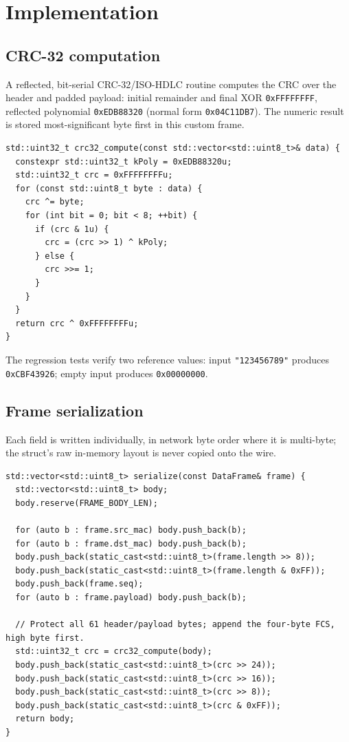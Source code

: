 \documentclass[11pt]{article}
\begin{document}
\section{Implementation}

\subsection{CRC-32 computation}
A reflected, bit-serial CRC-32/ISO-HDLC routine computes the CRC over the header
and padded payload: initial remainder and final XOR \texttt{0xFFFFFFFF}, reflected
polynomial \texttt{0xEDB88320} (normal form \texttt{0x04C11DB7}). The numeric
result is stored most-significant byte first in this custom frame.

\begin{lstlisting}
std::uint32_t crc32_compute(const std::vector<std::uint8_t>& data) {
  constexpr std::uint32_t kPoly = 0xEDB88320u;
  std::uint32_t crc = 0xFFFFFFFFu;
  for (const std::uint8_t byte : data) {
    crc ^= byte;
    for (int bit = 0; bit < 8; ++bit) {
      if (crc & 1u) {
        crc = (crc >> 1) ^ kPoly;
      } else {
        crc >>= 1;
      }
    }
  }
  return crc ^ 0xFFFFFFFFu;
}
\end{lstlisting}

The regression tests verify two reference values: input \texttt{"123456789"}
produces \texttt{0xCBF43926}; empty input produces \texttt{0x00000000}.

\subsection{Frame serialization}
Each field is written individually, in network byte order where it is multi-byte; the struct's raw
in-memory layout is never copied onto the wire.

\begin{lstlisting}
std::vector<std::uint8_t> serialize(const DataFrame& frame) {
  std::vector<std::uint8_t> body;
  body.reserve(FRAME_BODY_LEN);

  for (auto b : frame.src_mac) body.push_back(b);
  for (auto b : frame.dst_mac) body.push_back(b);
  body.push_back(static_cast<std::uint8_t>(frame.length >> 8));
  body.push_back(static_cast<std::uint8_t>(frame.length & 0xFF));
  body.push_back(frame.seq);
  for (auto b : frame.payload) body.push_back(b);

  // Protect all 61 header/payload bytes; append the four-byte FCS, high byte first.
  std::uint32_t crc = crc32_compute(body);
  body.push_back(static_cast<std::uint8_t>(crc >> 24));
  body.push_back(static_cast<std::uint8_t>(crc >> 16));
  body.push_back(static_cast<std::uint8_t>(crc >> 8));
  body.push_back(static_cast<std::uint8_t>(crc & 0xFF));
  return body;
}
\end{lstlisting}
\end{document}

